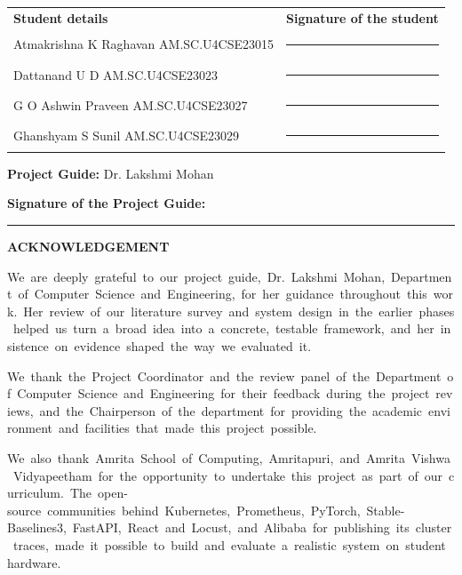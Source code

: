 \documentclass[12pt,a4paper,oneside]{report}
\begin{document}
\noindent
\begin{tabular}{@{}p{}p{}@{}}
\textbf{Student details} & \textbf{Signature of the student} \\[14pt]

Atmakrishna K Raghavan\newline
AM.SC.U4CSE23015
& \rule{0.30\textwidth}{0.4pt} \\[18pt]

Dattanand U D\newline
AM.SC.U4CSE23023
& \rule{0.30\textwidth}{0.4pt} \\[18pt]

G O Ashwin Praveen\newline
AM.SC.U4CSE23027
& \rule{0.30\textwidth}{0.4pt} \\[18pt]

Ghanshyam S Sunil\newline
AM.SC.U4CSE23029
& \rule{0.30\textwidth}{0.4pt}
\end{tabular}

\vspace{0.8cm}

\noindent
\textbf{Project Guide:} Dr. Lakshmi Mohan

\vspace{0.5cm}

\noindent
\textbf{Signature of the Project Guide:}
\rule{4cm}{0.4pt}

\clearpage

\clearpage
\clearpage
{}
\pagestyle{plain}

{}
{\centering \Large\bfseries ACKNOWLEDGEMENT\par}
We~are~deeply~grateful~to~our~project~guide,~Dr.~Lakshmi~Mohan,~Department~of~Computer~Science~and~Engineering,~for~her~guidance~throughout~this~work.~Her~review~of~our~literature~survey~and~system~design~in~the~earlier~phases~helped~us~turn~a~broad~idea~into~a~concrete,~testable~framework,~and~her~insistence~on~evidence~shaped~the~way~we~evaluated~it.

We~thank~the~Project~Coordinator~and~the~review~panel~of~the~Department~of~Computer~Science~and~Engineering~for~their~feedback~during~the~project~reviews,~and~the~Chairperson~of~the~department~for~providing~the~academic~environment~and~facilities~that~made~this~project~possible.

We~also~thank~Amrita~School~of~Computing,~Amritapuri,~and~Amrita~Vishwa~Vidyapeetham~for~the~opportunity~to~undertake~this~project~as~part~of~our~curriculum.~The~open-source~communities~behind~Kubernetes,~Prometheus,~PyTorch,~Stable-Baselines3,~FastAPI,~React~and~Locust,~and~Alibaba~for~publishing~its~cluster~traces,~made~it~possible~to~build~and~evaluate~a~realistic~system~on~student~hardware.
\end{document}
